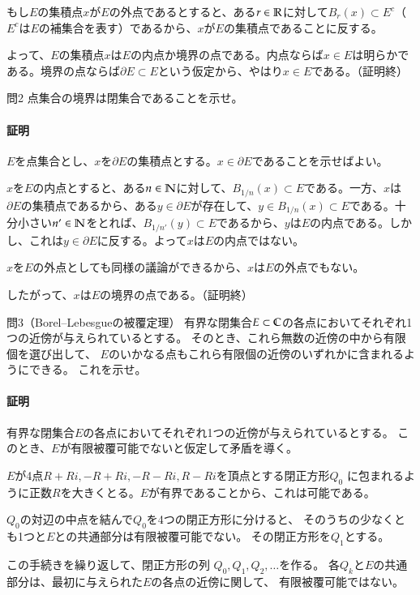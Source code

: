 もし$E$の集積点$x$が$E$の外点であるとすると、ある$r\in\mathbb{R}$に対して$B_r(x)\subset E^c$（$E^c$は$E$の補集合を表す）であるから、$x$が$E$の集積点であることに反する。

よって、$E$の集積点$x$は$E$の内点か境界の点である。内点ならば$x\in E$は明らかである。境界の点ならば$\partial E\subset E$という仮定から、やはり$x\in E$である。（証明終）

\begin{mysimplebox}{問2}
    点集合の境界は閉集合であることを示せ。 
\end{mysimplebox}
\paragraph{証明}
$E$を点集合とし、$x$を$\partial E$の集積点とする。$x\in\partial E$であることを示せばよい。

$x$を$E$の内点とすると、ある$n\in\mathbb{N}$に対して、$B_{1/n}(x)\subset E$である。一方、$x$は$\partial E$の集積点であるから、ある$y\in\partial E$が存在して、$y\in B_{1/n}(x)\subset E$である。十分小さい$n'\in\mathbb{N}$をとれば、$B_{1/n'}(y)\subset E$であるから、$y$は$E$の内点である。しかし、これは$y\in\partial E$に反する。よって$x$は$E$の内点ではない。

$x$を$E$の外点としても同様の議論ができるから、$x$は$E$の外点でもない。

したがって、$x$は$E$の境界の点である。（証明終）

\begin{mysimplebox}{問3（Borel--Lebesgueの被覆定理）}
    有界な閉集合$E\subset\mathbb{C}$の各点においてそれぞれ1つの近傍が与えられているとする。
    そのとき、これら無数の近傍の中から有限個を選び出して、
    $E$のいかなる点もこれら有限個の近傍のいずれかに含まれるようにできる。
    これを示せ。
\end{mysimplebox}
\paragraph{証明}
有界な閉集合$E$の各点においてそれぞれ1つの近傍が与えられているとする。
このとき、$E$が有限被覆可能でないと仮定して矛盾を導く。

$E$が4点$R+Ri, -R+Ri, -R-Ri, R-Ri$を頂点とする閉正方形$Q_0$
に包まれるように正数$R$を大きくとる。$E$が有界であることから、これは可能である。

$Q_0$の対辺の中点を結んで$Q_0$を4つの閉正方形に分けると、
そのうちの少なくとも1つと$E$との共通部分は有限被覆可能でない。
その閉正方形を$Q_1$とする。

この手続きを繰り返して、閉正方形の列
$Q_0, Q_1, Q_2,\dots$を作る。
各$Q_k$と$E$の共通部分は、最初に与えられた$E$の各点の近傍に関して、
有限被覆可能ではない。

